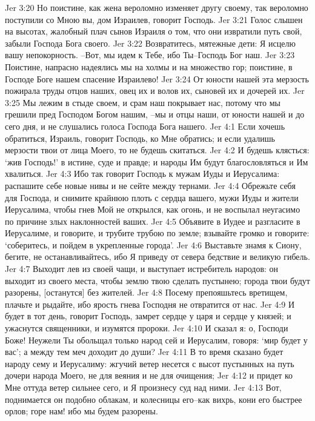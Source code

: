 Jer 3:20  Но поистине, как жена вероломно изменяет другу своему, так вероломно поступили со Мною вы, дом Израилев, говорит Господь.
Jer 3:21  Голос слышен на высотах, жалобный плач сынов Израиля о том, что они извратили путь свой, забыли Господа Бога своего.
Jer 3:22  Возвратитесь, мятежные дети: Я исцелю вашу непокорность. --Вот, мы идем к Тебе, ибо Ты--Господь Бог наш.
Jer 3:23  Поистине, напрасно надеялись мы на холмы и на множество гор; поистине, в Господе Боге нашем спасение Израилево!
Jer 3:24  От юности нашей эта мерзость пожирала труды отцов наших, овец их и волов их, сыновей их и дочерей их.
Jer 3:25  Мы лежим в стыде своем, и срам наш покрывает нас, потому что мы грешили пред Господом Богом нашим, --мы и отцы наши, от юности нашей и до сего дня, и не слушались голоса Господа Бога нашего.
Jer 4:1  Если хочешь обратиться, Израиль, говорит Господь, ко Мне обратись; и если удалишь мерзости твои от лица Моего, то не будешь скитаться.
Jer 4:2  И будешь клясться: `жив Господь!' в истине, суде и правде; и народы Им будут благословляться и Им хвалиться.
Jer 4:3  Ибо так говорит Господь к мужам Иуды и Иерусалима: распашите себе новые нивы и не сейте между тернами.
Jer 4:4  Обрежьте себя для Господа, и снимите крайнюю плоть с сердца вашего, мужи Иуды и жители Иерусалима, чтобы гнев Мой не открылся, как огонь, и не воспылал неугасимо по причине злых наклонностей ваших.
Jer 4:5  Объявите в Иудее и разгласите в Иерусалиме, и говорите, и трубите трубою по земле; взывайте громко и говорите: `соберитесь, и пойдем в укрепленные города'.
Jer 4:6  Выставьте знамя к Сиону, бегите, не останавливайтесь, ибо Я приведу от севера бедствие и великую гибель.
Jer 4:7  Выходит лев из своей чащи, и выступает истребитель народов: он выходит из своего места, чтобы землю твою сделать пустынею; города твои будут разорены, [останутся] без жителей.
Jer 4:8  Посему препояшьтесь вретищем, плачьте и рыдайте, ибо ярость гнева Господня не отвратится от нас.
Jer 4:9  И будет в тот день, говорит Господь, замрет сердце у царя и сердце у князей; и ужаснутся священники, и изумятся пророки.
Jer 4:10  И сказал я: о, Господи Боже! Неужели Ты обольщал только народ сей и Иерусалим, говоря: `мир будет у вас'; а между тем меч доходит до души?
Jer 4:11  В то время сказано будет народу сему и Иерусалиму: жгучий ветер несется с высот пустынных на путь дочери народа Моего, не для веяния и не для очищения;
Jer 4:12  и придет ко Мне оттуда ветер сильнее сего, и Я произнесу суд над ними.
Jer 4:13  Вот, поднимается он подобно облакам, и колесницы его--как вихрь, кони его быстрее орлов; горе нам! ибо мы будем разорены.
